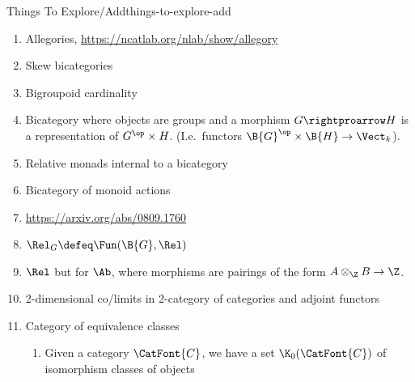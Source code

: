\begin{remark}{Things To Explore/Add}{things-to-explore-add}
\begin{enumerate}
\begin{enumerate}
                \item quoting from elsewhere here:
                    \begin{quote}
                        Apartness defines a composition for relations, but its analogue
                        \[
                            \mathfrak{q}\mathbin{\square}\mathfrak{p}%
                            \defeq%
                            \int_{A\in\CatFont{C}}\mathfrak{p}^{-_{1}}_{A}\icoprod\mathfrak{q}^{A}_{-_{2}}%
                        \]%
                        fails to be unital for profunctors with the unit $h^{A}_{-}$. The issue is that while $\mathcal{P}(X)$ is *-autonomous, $\PSh(\CatFont{C})$ need not be so.

                        However, if $\CatFont{V}$ is $*$-autonomous, then $\mathsf{Prof}_{\CatFont{V}}$ is a linear bicategory (Proposition 6.6 of \url{https://arxiv.org/abs/2209.05693}). In that case, there's probably a calculus of left/right Kan extensions/lifts one can develop. What is it?
                    \end{quote}
            \end{enumerate}
        \item Allegories, \url{https://ncatlab.org/nlab/show/allegory}
        \item Skew bicategories
        \item Bigroupoid cardinality
        \item Bicategory where objects are groups and a morphism $G\rightproarrow H$ is a representation of $G^{\op}\times H$. (I.e.\ functors $\B{G}^{\op}\times\B{H}\to\Vect_{k}$).
        \item Relative monads internal to a bicategory
        \item Bicategory of monoid actions
        \item \url{https://arxiv.org/abs/0809.1760}
        \item $\Rel_{G}\defeq\Fun(\B{G},\Rel)$
        \item $\Rel$ but for $\Ab$, where morphisms are pairings of the form $A\otimes_{\Z}B\to\Z$.
        \item 2-dimensional co/limits in 2-category of categories and adjoint functors
        \item Category of equivalence classes
            \begin{enumerate}
                \item Given a category $\CatFont{C}$, we have a set $\K_{0}(\CatFont{C})$ of isomorphism classes of objects

\end{enumerate}
\end{enumerate}
\end{remark}
